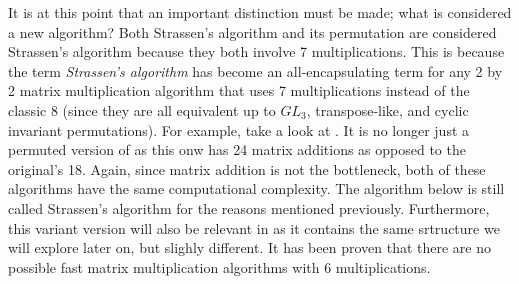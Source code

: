     It is at this point that an important distinction must be made; what is
    considered a new algorithm? Both Strassen's algorithm and its permutation
    are considered Strassen's algorithm because they both involve 7
    multiplications. This is because the term \textit{Strassen's algorithm} has
    become an all-encapsulating term for any 2 by 2 matrix multiplication
    algorithm that uses 7 multiplications instead of the classic 8 (since they
    are all equivalent up to $GL_3$, transpose-like, and cyclic invariant
    permutations). For example, take a look at . It is no
    longer just a permuted version of  as this onw has
    24 matrix additions as opposed to the original's 18. Again, since matrix
    addition is not the bottleneck, both of these algorithms have the same
    computational complexity. The algorithm below is still called Strassen's
    algorithm for the reasons mentioned previously. Furthermore, this variant
    version will also be relevant in  as it contains
    the same srtructure we will explore later on, but slighly different. It has
    been proven that there are no possible fast matrix multiplication algorithms
    with 6 multiplications. 

